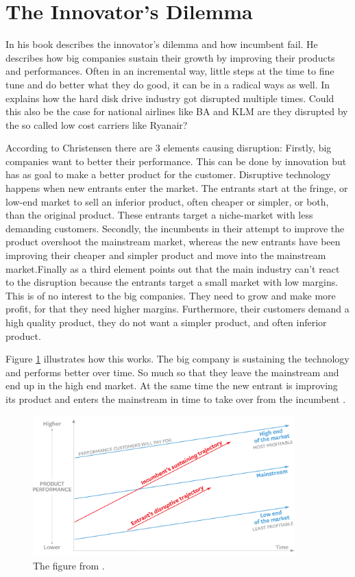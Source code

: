 \documentclass[a4paper, 11pt]{article}
\begin{document}
\section{The Innovator's Dilemma}


In his book \cite{Christensen97} describes the innovator's dilemma and how incumbent fail. He describes how big companies sustain their growth by improving their products and performances. Often in an incremental way, little steps at the time to fine tune and do better what they do good, it can be in a radical ways as well. In \citep{Christensen97} explains how the hard disk drive industry got disrupted multiple times. Could this also be the case for national airlines like BA and KLM are they disrupted by the so called low cost carriers like Ryanair?

According to Christensen \cite{Christensen97} there are 3 elements causing disruption: Firstly, big companies want to better their performance. This can be done by innovation but has as goal to make a better product for the customer. Disruptive technology happens when new entrants enter the market. The entrants start at the fringe, or low-end market to sell an inferior product, often cheaper or simpler, or both, than the original product. These entrants target a niche-market with less demanding customers. Secondly, the incumbents in their attempt to improve the product overshoot the mainstream market, whereas the new entrants have been improving their cheaper and simpler product and move into the mainstream market.Finally as a third element \cite{Christensen97} points out that the main industry can't react to the disruption because the entrants target a small market with low margins. This is of no interest to the big companies. They need to grow and make more profit, for that they need higher margins. Furthermore, their customers demand a high quality product, they do not want a simpler product, and often inferior product.

Figure \ref{fig:graph1} illustrates how this works. The big company is sustaining the technology and performs better over time. So much so that they leave the mainstream and end up in the high end market. At the same time the new entrant is improving its product and enters the mainstream in time to take over from the incumbent \cite{Christensen97}.

\begin{figure}[h!]
    \centering
    \includegraphics[width=0.9\textwidth]{big-model.png}
    \caption{The figure from \cite{Christensen2015}.}
    \label{fig:graph1}
\end{figure}
\end{document}
